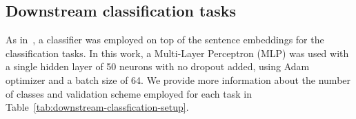 \documentclass{article}
\begin{document}
 
\subsection{Downstream classification tasks}
As in~\cite{conneau2018senteval}, a classifier was employed on top of the sentence embeddings for the classification tasks. In this work, a Multi-Layer Perceptron (MLP) was used with a single hidden layer of 50 neurons with no dropout added, using Adam~\cite{journals/corr/KingmaB14} optimizer and a batch size of 64. We provide more information about the number of classes and validation scheme employed for each task in Table~\ref{tab:downstream-classfication-setup}.

\begin{table}[h]
\centering
\caption{Downstream classification tasks setup.}
\label{tab:downstream-classfication-setup}
\end{table}
\end{document}
